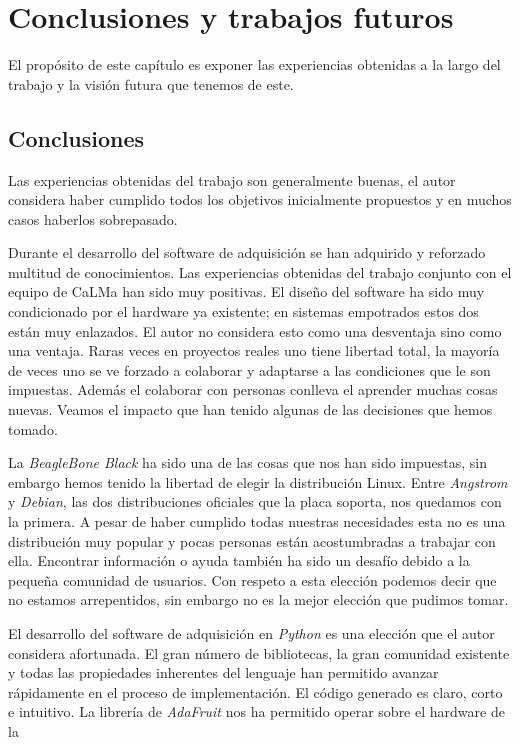 \chapter{Conclusiones y trabajos futuros}
\label{cap_conclusiones}
El propósito de este capítulo es exponer las experiencias obtenidas a la largo del trabajo y la visión futura que tenemos de este.

\section{Conclusiones}
	Las experiencias obtenidas del trabajo son generalmente buenas, el autor considera haber cumplido todos los objetivos inicialmente propuestos
	y en muchos casos haberlos sobrepasado. 
	\par
	Durante el desarrollo del software de adquisición se han adquirido y reforzado multitud de conocimientos. Las experiencias obtenidas del
	trabajo conjunto con el equipo de CaLMa han sido muy positivas. El diseño del software ha sido muy condicionado por el hardware ya existente;
	en sistemas empotrados estos dos están muy enlazados. El autor no considera esto como una desventaja sino como una ventaja. Raras veces en
	proyectos reales uno tiene libertad total, la mayoría de veces uno se ve forzado  a colaborar y adaptarse a las condiciones que le son
	impuestas. Además el colaborar con personas conlleva el aprender muchas cosas nuevas. Veamos el impacto que han tenido algunas de las
	decisiones que hemos tomado.
	\par
	La \emph{BeagleBone Black} ha sido una de las cosas que nos han sido impuestas, sin embargo hemos tenido la libertad de elegir la distribución Linux.
	Entre \emph{Angstrom} y \emph{Debian}, las dos distribuciones oficiales que la placa soporta, nos quedamos con la primera. A pesar de haber cumplido todas
	nuestras necesidades esta no es una distribución muy popular y pocas personas están acostumbradas a trabajar con ella. Encontrar información o
	ayuda también ha sido un desafío debido a la pequeña comunidad de usuarios. Con respeto a esta elección podemos decir que no estamos
	arrepentidos, sin embargo no es la mejor elección que pudimos tomar. 
	\par
	El desarrollo del software de adquisición en \emph{Python} es una elección que el autor considera afortunada. El gran número de bibliotecas, la gran
	comunidad existente y todas las propiedades inherentes del lenguaje han permitido avanzar rápidamente en el proceso de implementación. El
	código generado es claro, corto e intuitivo. La librería de \emph{AdaFruit}\cite{AdaFruitGit} nos ha permitido operar sobre el hardware de la
